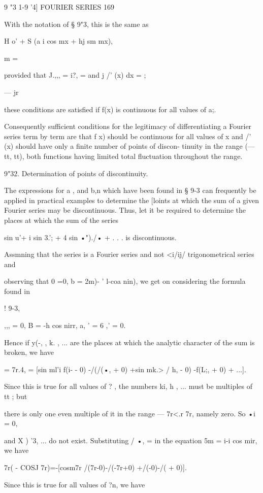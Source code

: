 9 "3 1-9 '4] FOURIER SERIES 169

With the notation of § 9"3, this is the same as

H o' + S (a i cos mx + hj sm mx),

  m = \

provided that J.,,, = i?, = and j /' (x) dx = ;

— jr

these conditions are satisfied if f(x) is continuous for all values of
a;.

Consequently sufficient conditions for the legitimacy of
differentiating a Fourier series term by term are that f x) should be
continuous for all values of x and /' (x) should have only a finite
number of points of discon- tinuity in the range (— tt, tt), both
functions having limited total fluctuation throughout the range.

9"32. Determination of points of discontinuity.

The expressions for a , and b,n which have been found in § 9-3 can
frequently be applied in practical examples to determine the [loints
at which the sum of a given Fourier series may be discontinuous. Thus,
let it be required to determine the places at which the sum of the
series

sin u'+ i sin 3.'; + 4 sin •")./• + . . . is discontinuous.

  Assmning that the series is a Fourier series and not <i/ij/
trigonometrical series and

observing that 0 =0, b = 2m)- ' l-coa nin), we get on considering the
formula found in

! 9-3,

 ,,, = 0, B = -h cos nirr, a, ' = 6 ,' = 0.

Hence if y(-, , k. , ... are the places at which the analytic
character of the sum is broken, we have

= 7r.4, = [sin ml'i f(i- - 0) -/(/(•, + 0) +sin mk.> / h, - 0) -f(L;,
+ 0) + ...].

Since this is true for all values of ? , the numbers ki, h , ... must
be multiples of tt ; but

there is only one even multiple of it in the range — 7r<.r 7r, namely
zero. So •i = 0,

and X ) '3, ... do not exist. Substituting / •, = in the equation 5m =
i-i cos mir, we have

7r( - COSJ 7r)=-[cosm7r /(7r-0)-/(-7r+0) +/(-0)-/( + 0)].

Since this is true for all values of ?n, we have

